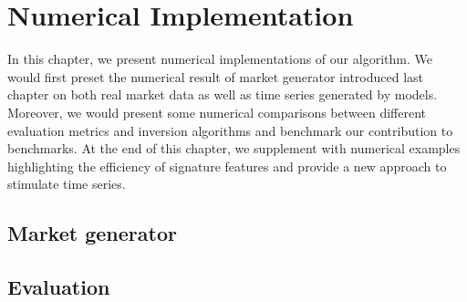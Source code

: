 \documentclass[12pt]{report}
\theoremstyle{definition}
\theoremstyle{remark}
\begin{document}
\chapter{Numerical Implementation}
In this chapter, we present numerical implementations of our algorithm. We would first preset the numerical result of market generator introduced last chapter on both real market data as well as time series generated by models. Moreover, we would present some numerical comparisons between different evaluation metrics and inversion algorithms and benchmark our contribution to benchmarks. At the end of this chapter, we supplement with numerical examples highlighting the efficiency of signature features and provide a new approach to stimulate time series. 
\section{Market generator}
\section{Evaluation}
\end{document}
